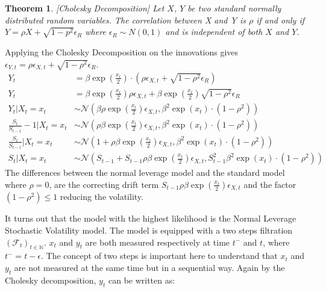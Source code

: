 \documentclass[11pt,a4,twosided,singlespacing,titlepagenumber=on]{scrreprt}
\numberwithin{equation}{chapter} %
\newtheorem{theorem}{Theorem}%
\theoremstyle{remark}
\begin{document}
\begin{theorem}
\textit{
[Cholesky Decomposition] Let $X$, $Y$ be two standard normally distributed random variables. The correlation between X and Y is $\rho$ if and only if $Y = \rho X + \sqrt{1-p^2} \epsilon_R$ where $\epsilon_R \sim N(0,1)$ and is independent of both $X$ and $Y$.
}
\end{theorem}

\noindent
Applying the Cholesky Decomposition on the innovations gives $\epsilon_{Y,t} = \rho \epsilon_{X,t} + \sqrt{1-\rho^2} \epsilon_R$.
\begin{align*}
Y_t 								&= \beta \exp \left(\frac{x_t}{2}\right) \cdot \left( \rho \epsilon_{X,t} + \sqrt{1-\rho^2} \epsilon_R \right) \\
Y_t 								&= \beta \exp \left(\frac{x_t}{2}\right)  \rho \epsilon_{X,t} + \beta \exp \left(\frac{x_t}{2}\right) \sqrt{1-\rho^2} \epsilon_R \\
Y_t | X_t = x_t 					&\sim \mathcal{N} \left(\beta \rho \exp \left(\frac{x_t}{2}\right) \epsilon_{X,t}, \beta^2 \exp \left(x_t\right) \cdot (1-\rho^2) \right) \\
\frac{S_t}{S_{t-1}}-1 | X_t = x_t 	&\sim \mathcal{N}\left(\rho \beta \exp \left(\frac{x_t}{2} \right) \epsilon_{X,t}, \beta^2 \exp(x_t) \cdot (1-\rho^2)\right) \\
\frac{S_t}{S_{t-1}} | X_t = x_t 	&\sim \mathcal{N}\left(1 + \rho \beta \exp \left(\frac{x_t}{2} \right) \epsilon_{X,t}, \beta^2 \exp(x_t) \cdot (1-\rho^2)\right) \\
S_t | X_t = x_t 					&\sim \mathcal{N}\left( S_{t-1} + S_{t-1} \rho \beta \exp \left(\frac{x_t}{2} \right) \epsilon_{X,t}, S_{t-1}^2 \beta^2 \exp(x_t) \cdot (1-\rho^2)\right)
\end{align*}
The differences between the normal leverage model and the standard model where $\rho = 0$, are the correcting drift term $S_{t-1} \rho \beta \exp \left(\frac{x_t}{2} \right) \epsilon_{X,t}$ and the factor $(1-\rho^2) \leq 1$ reducing the volatility.

It turns out that the model with the highest likelihood is the Normal Leverage Stochastic Volatility model. The model is equipped with a two steps filtration $(\mathcal{F}_t)_{t \in \mathbb{N}}$. $x_t$ and $y_t$ are both measured respectively at time $t^-$ and $t$, where $t^- = t - \epsilon$. The concept of two steps is important here to understand that $x_t$ and $y_t$ are not measured at the same time but in a sequential way. Again by the Cholesky decomposition, $y_t$ can be written as:
\end{document}
